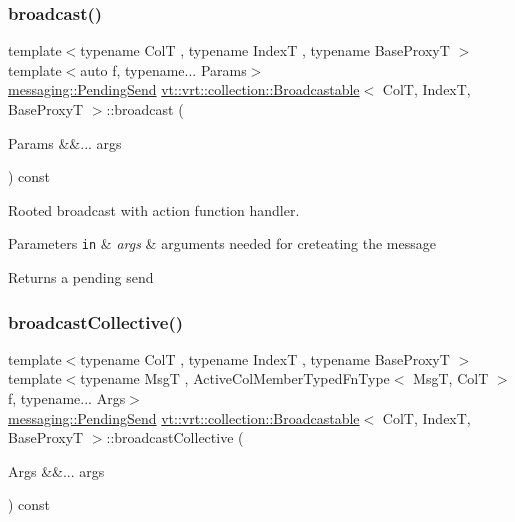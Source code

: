 \subsubsection{\texorpdfstring{broadcast()}{broadcast()}\hspace{0.1cm}{\footnotesize\ttfamily [7/7]}}
{\footnotesize\ttfamily template$<$typename ColT , typename IndexT , typename Base\+ProxyT $>$ \\
template$<$auto f, typename... Params$>$ \\
\hyperlink{structvt_1_1messaging_1_1_pending_send}{messaging\+::\+Pending\+Send} \hyperlink{structvt_1_1vrt_1_1collection_1_1_broadcastable}{vt\+::vrt\+::collection\+::\+Broadcastable}$<$ ColT, IndexT, Base\+ProxyT $>$\+::broadcast (\begin{DoxyParamCaption}\item[{Params \&\&...}]{args }\end{DoxyParamCaption}) const}



Rooted broadcast with action function handler. 


\begin{DoxyParams}[1]{Parameters}
\mbox{\tt in}  & {\em args} & arguments needed for creteating the message\\
\hline
\end{DoxyParams}
\begin{DoxyReturn}{Returns}
a pending send 
\end{DoxyReturn}
\mbox{\label{structvt_1_1vrt_1_1collection_1_1_broadcastable_acef03dd57082f32556bef0e536a07fe9}} 
\subsubsection{\texorpdfstring{broadcast\+Collective()}{broadcastCollective()}\hspace{0.1cm}{\footnotesize\ttfamily [1/3]}}
{\footnotesize\ttfamily template$<$typename ColT , typename IndexT , typename Base\+ProxyT $>$ \\
template$<$typename MsgT , Active\+Col\+Member\+Typed\+Fn\+Type$<$ Msg\+T, Col\+T $>$ f, typename... Args$>$ \\
\hyperlink{structvt_1_1messaging_1_1_pending_send}{messaging\+::\+Pending\+Send} \hyperlink{structvt_1_1vrt_1_1collection_1_1_broadcastable}{vt\+::vrt\+::collection\+::\+Broadcastable}$<$ ColT, IndexT, Base\+ProxyT $>$\+::broadcast\+Collective (\begin{DoxyParamCaption}\item[{Args \&\&...}]{args }\end{DoxyParamCaption}) const}



